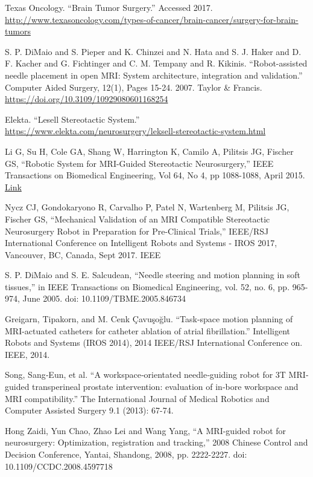 \documentclass[12pt]{report}
\begin{document}
\begin{thebibliography}{99}
 Texas Oncology. ``Brain Tumor Surgery.'' Accessed 2017. \url{http://www.texasoncology.com/types-of-cancer/brain-cancer/surgery-for-brain-tumors}

 S. P. DiMaio and S. Pieper and K. Chinzei and N. Hata and S. J. Haker and D. F. Kacher and G. Fichtinger and C. M. Tempany and R. Kikinis. ``Robot-assisted needle placement in open MRI: System architecture, integration and validation.'' Computer Aided Surgery, 12(1), Pages 15-24. 2007. Taylor \& Francis. \url{https://doi.org/10.3109/10929080601168254}

 Elekta. ``Lesell Stereotactic System.'' \url{https://www.elekta.com/neurosurgery/leksell-stereotactic-system.html}

 Li G, Su H, Cole GA, Shang W, Harrington K, Camilo A, Pilitsis JG, Fischer GS, ``Robotic System for MRI-Guided Stereotactic Neurosurgery,'' IEEE Transactions on Biomedical Engineering, Vol 64, No 4, pp 1088-1088, April 2015. \href{http://aimlab.wpi.edu/includes/publications/2014_TBME_Li_Fischer_RoboticSystemforMRIGuidedStereotacticNeurosurgery.pdf}{Link}

 Nycz CJ, Gondokaryono R, Carvalho P, Patel N, Wartenberg M, Pilitsis JG, Fischer GS, ``Mechanical Validation of an MRI Compatible Stereotactic Neurosurgery Robot in Preparation for Pre-Clinical Trials,'' IEEE/RSJ International Conference on Intelligent Robots and Systems - IROS 2017, Vancouver, BC, Canada, Sept 2017. IEEE

 S. P. DiMaio and S. E. Salcudean, ``Needle steering and motion planning in soft tissues,'' in IEEE Transactions on Biomedical Engineering, vol. 52, no. 6, pp. 965-974, June 2005. doi: 10.1109/TBME.2005.846734

 Greigarn, Tipakorn, and M. Cenk Çavuşoğlu. ``Task-space motion planning of MRI-actuated catheters for catheter ablation of atrial fibrillation.'' Intelligent Robots and Systems (IROS 2014), 2014 IEEE/RSJ International Conference on. IEEE, 2014.

 Song, Sang‐Eun, et al. ``A workspace‐orientated needle‐guiding robot for 3T MRI‐guided transperineal prostate intervention: evaluation of in‐bore workspace and MRI compatibility.'' The International Journal of Medical Robotics and Computer Assisted Surgery 9.1 (2013): 67-74.

 Hong Zaidi, Yun Chao, Zhao Lei and Wang Yang, ``A MRI-guided robot for neurosurgery: Optimization, registration and tracking,'' 2008 Chinese Control and Decision Conference, Yantai, Shandong, 2008, pp. 2222-2227. doi: 10.1109/CCDC.2008.4597718


\end{thebibliography}
\end{document}
